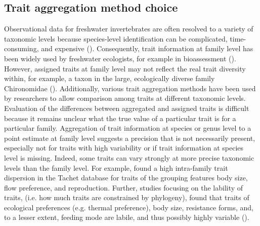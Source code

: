 \documentclass{article}
\begin{document}

\subsection*{Trait aggregation method choice}

Observational data for freshwater invertebrates are often resolved to a variety of taxonomic levels because species-level identification can be complicated, time-consuming, and expensive (\cite{marshall_taxonomic_2006, resh_which_2008}). Consequently, trait information at family level has been widely used by freshwater ecologists, for example in bioassessment (\cite{beketov_spear_2009}).
However, assigned traits at family level may not reflect the real trait diversity within, for example, a taxon in the large, ecologically diverse family Chironomidae (\cite{serra_synthesising_2016}). Additionally, various trait aggregation methods have been used by researchers to allow comparison among traits at different taxonomic levels. Evaluation of the differences between aggregated and assigned traits is difficult because it remains unclear what the true value of a particular trait is for a particular family. Aggregation of trait information at species or genus level to a point estimate at family level suggests a precision that is not necessarily present, especially not for traits with high variability or if trait information at species level is missing. Indeed, some traits can vary strongly at more precise taxonomic levels than the family level. For example, \citet{monaghan_improving_2013} found a high intra-family trait dispersion in the Tachet database for traits of the grouping features body size, flow preference, and reproduction. Further, studies focusing on the lability of traits, (i.e. how much traits are constrained by phylogeny), found that traits of ecological preferences (e.g. thermal preference), body size, resistance forms, and, to a lesser extent, feeding mode are labile, and thus possibly highly variable (\cite{poff_functional_2006, wilkes_traitbased_2020}). 
\end{document}
